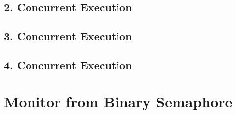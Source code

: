 \documentclass{report}
\begin{document}
		\subsection{2. Concurrent Execution}
		\startsubsection
		\closesection
		\subsection{3. Concurrent Execution}
		\startsubsection
		\closesection
		\subsection{4. Concurrent Execution}
		\startsubsection
		\closesection
	\closesection
	\section{Monitor from Binary Semaphore}
	\startsection
	\closesection
\end{document}
